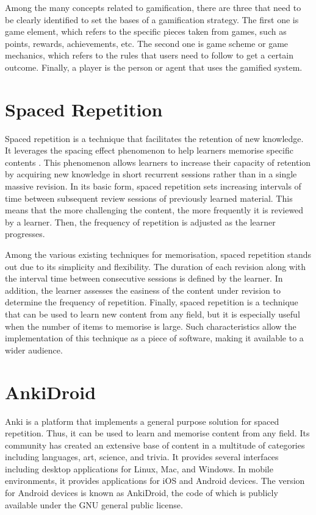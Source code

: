 Among the many concepts related to gamification, there are three that need to be clearly identified to set the bases of a gamification strategy. The first one is game element, which refers to the specific pieces taken from games, such as points, rewards, achievements, etc. The second one is game scheme or game mechanics, which refers to the rules that users need to follow to get a certain outcome. Finally, a player is the person or agent that uses the gamified system.

\section{Spaced Repetition}
Spaced repetition is a technique that facilitates the retention of new knowledge. It leverages the spacing effect phenomenon to help learners memorise specific contents \citep{hintzman1974theoretical}. This phenomenon allows learners to increase their capacity of retention by acquiring new knowledge in short recurrent sessions rather than in a single massive revision. In its basic form, spaced repetition sets increasing intervals of time between subsequent review sessions of previously learned material. This means that the more challenging the content, the more frequently it is reviewed by a learner. Then, the frequency of repetition is adjusted as the learner progresses.

Among the various existing techniques for memorisation, spaced repetition stands out due to its simplicity and flexibility. The duration of each revision along with the interval time between consecutive sessions is defined by the learner. In addition, the learner assesses the easiness of the content under revision to determine the frequency of repetition. Finally, spaced repetition is a technique that can be used to learn new content from any field, but it is especially useful when the number of items to memorise is large. Such characteristics allow the implementation of this technique as a piece of software, making it available to a wider audience.

\section{AnkiDroid}
Anki is a platform that implements a general purpose solution for spaced repetition. Thus, it can be used to learn and memorise content from any field. Its community has created an extensive base of content in a multitude of categories including languages, art, science, and trivia. It provides several interfaces including desktop applications for Linux, Mac, and Windows. In mobile environments, it provides applications for iOS and Android devices. The version for Android devices is known as AnkiDroid, the code of which is publicly available under the GNU general public license.

